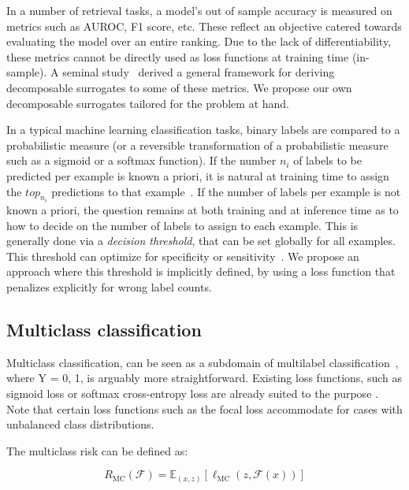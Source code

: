In a number of retrieval tasks, a model's out of sample accuracy is measured
on metrics such as AUROC, F1 score, etc. These reflect an objective catered
towards evaluating the model over an entire ranking. Due to the lack of
differentiability, these metrics cannot be directly used as loss functions at
training time (in-sample). A seminal study~\cite{optimizableLosses} derived a
general framework for deriving decomposable surrogates to some of these
metrics. We propose our own decomposable surrogates tailored for the problem
at hand.

In a typical machine learning classification tasks, binary labels are compared to a probabilistic measure (or a reversible
transformation of a probabilistic measure such as a sigmoid or a softmax
function). If the number $n_i$ of labels to be predicted per
example is known a priori, it is natural at training time to assign the $top_{n_i}$ predictions
to that example~\cite{lossTopKError, topKmulticlassSVM}. If the number of
labels per example is not known a priori, the question remains at both training and at inference time
as to how to decide on the number of labels to assign to each
example. This is generally done via a \emph{decision threshold}, that can be set globally for all
examples. This threshold can optimize for specificity or
sensitivity~\cite{decisionThreshold}. We propose an approach where this threshold
is implicitly defined, by using a loss function that penalizes explicitly for wrong label counts.



\subsection{Multiclass classification}
\label{section:background:multiclassClassification}

Multiclass classification, can be seen as a subdomain of multilabel classification~\citep{multilabelReduction}, where Y = {0, 1}, is arguably more straightforward. Existing loss functions, such as sigmoid loss or softmax cross-entropy loss are already suited to the purpose . Note that certain loss functions such as the focal loss accommodate for cases with unbalanced class distributions. 

The multiclass risk can be defined as:

\begin{equation}
R_{\mathrm{MC}}(\mathcal{F}) = \mathbb{E}_{(x, z)}\left[\ell_{\mathrm{MC}}(z, \mathcal{F}(x))\right]
\end{equation}

